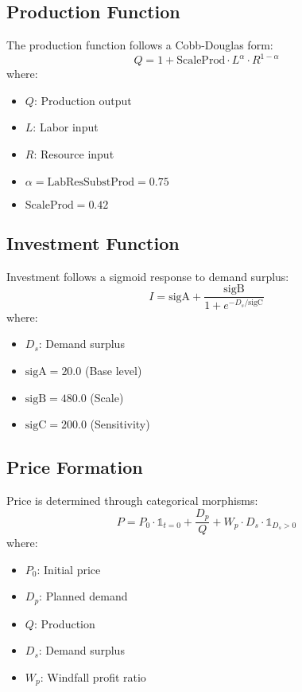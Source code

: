 \documentclass{article}
\begin{document}
\subsection{Production Function}
The production function follows a Cobb-Douglas form:
\begin{equation}
    Q = 1 + \text{ScaleProd} \cdot L^{\alpha} \cdot R^{1-\alpha}
\end{equation}
where:
\begin{itemize}
    \item $Q$: Production output
    \item $L$: Labor input
    \item $R$: Resource input
    \item $\alpha = \text{LabResSubstProd} = 0.75$
    \item $\text{ScaleProd} = 0.42$
\end{itemize}

\subsection{Investment Function}
Investment follows a sigmoid response to demand surplus:
\begin{equation}
    I = \text{sigA} + \frac{\text{sigB}}{1 + e^{-D_s/\text{sigC}}}
\end{equation}
where:
\begin{itemize}
    \item $D_s$: Demand surplus
    \item $\text{sigA} = 20.0$ (Base level)
    \item $\text{sigB} = 480.0$ (Scale)
    \item $\text{sigC} = 200.0$ (Sensitivity)
\end{itemize}

\subsection{Price Formation}
Price is determined through categorical morphisms:
\begin{equation}
    P = P_0 \cdot \mathbb{1}_{t=0} + \frac{D_p}{Q} + W_p \cdot D_s \cdot \mathbb{1}_{D_s > 0}
\end{equation}
where:
\begin{itemize}
    \item $P_0$: Initial price
    \item $D_p$: Planned demand
    \item $Q$: Production
    \item $D_s$: Demand surplus
    \item $W_p$: Windfall profit ratio
\end{itemize}
\end{document}
